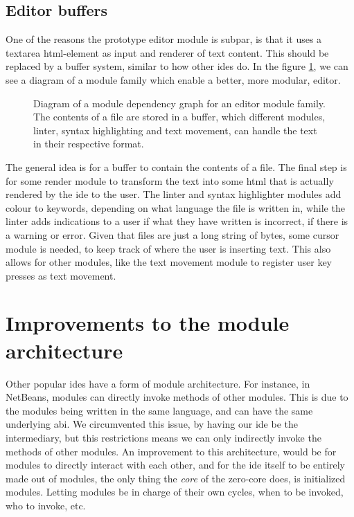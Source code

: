 \subsection{Editor buffers}

One of the reasons the prototype editor module is subpar, is that it uses a
textarea \gls*{html}-element as input and renderer of text content. This should
be replaced by a buffer system, similar to how other \gls*{ide}s do. In the
figure \ref{fig:editorBuffer}, we can see a diagram of a module family which
enable a better, more modular, editor.

\begin{figure}
  \centering
  
  \caption{
    Diagram of a module dependency graph for an editor module family. The
    contents of a file are stored in a buffer, which different modules, linter,
    syntax highlighting and text movement, can handle the text in their
    respective format.
  }
  \label{fig:editorBuffer}
\end{figure}

The general idea is for a buffer to contain the contents of a file. The final
step is for some render module to transform the text into some \gls*{html} that
is actually rendered by the \gls*{ide} to the user. The linter and syntax
highlighter modules add colour to keywords, depending on what language the file
is written in, while the linter adds indications to a user if what they have
written is incorrect, if there is a warning or error. Given that files are just
a long string of bytes, some cursor module is needed, to keep track of where the
user is inserting text. This also allows for other modules, like the text
movement module to register user key presses as text movement.


\section{Improvements to the module architecture}

Other popular \gls*{ide}s have a form of module architecture. For instance, in
NetBeans, modules can directly invoke methods of other modules. This is due to
the modules being written in the same language, and can have the same underlying
\gls*{abi}. We circumvented this issue, by having our \gls*{ide} be the
intermediary, but this restrictions means we can only indirectly invoke the
methods of other modules. An improvement to this architecture, would be for
modules to directly interact with each other, and for the \gls*{ide} itself to be
entirely made out of modules, the only thing the \textit{core} of the zero-core
does, is initialized modules. Letting modules be in charge of their own cycles,
when to be invoked, who to invoke, etc.
